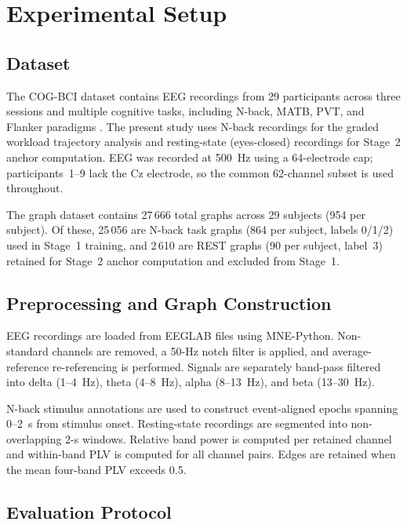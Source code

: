 \documentclass{ieeeaccess}
\begin{document}
\section{Experimental Setup}
\label{sec:setup}

\subsection{Dataset}

The COG-BCI dataset contains EEG recordings from 29 participants across three
sessions and multiple cognitive tasks, including N-back, MATB, PVT, and Flanker
paradigms \cite{hinss2023}. The present study uses N-back recordings for the
graded workload trajectory analysis and resting-state (eyes-closed) recordings
for Stage~2 anchor computation. EEG was recorded at 500~Hz using a
64-electrode cap; participants~1--9 lack the Cz electrode, so the common
62-channel subset is used throughout.

The graph dataset contains 27\,666 total graphs across 29 subjects (954 per
subject). Of these, 25\,056 are N-back task graphs (864 per subject,
labels 0/1/2) used in Stage~1 training, and 2\,610 are REST graphs (90 per
subject, label~3) retained for Stage~2 anchor computation and excluded from
Stage~1.

\subsection{Preprocessing and Graph Construction}

EEG recordings are loaded from EEGLAB files using MNE-Python. Non-standard
channels are removed, a 50-Hz notch filter is applied, and average-reference
re-referencing is performed. Signals are separately band-pass filtered into
delta (1--4~Hz), theta (4--8~Hz), alpha (8--13~Hz), and beta (13--30~Hz).

N-back stimulus annotations are used to construct event-aligned epochs spanning
0--2~s from stimulus onset. Resting-state recordings are segmented into
non-overlapping 2-s windows. Relative band power is computed per retained
channel and within-band PLV is computed for all channel pairs. Edges are
retained when the mean four-band PLV exceeds 0.5.

\subsection{Evaluation Protocol}
\end{document}
